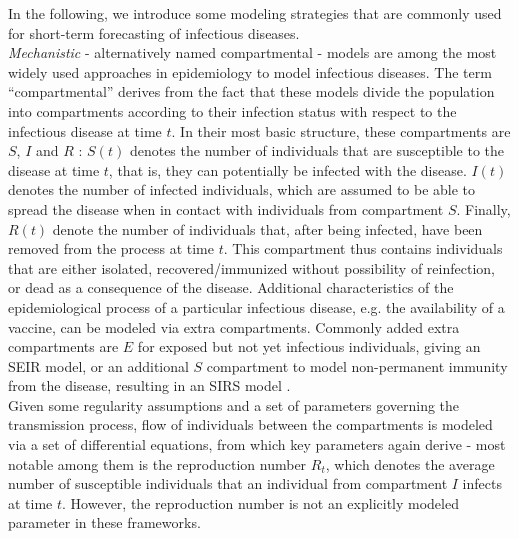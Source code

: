 In the following, we introduce some modeling strategies that are commonly used for short-term forecasting of infectious diseases.\\
\textit{Mechanistic} - alternatively named compartmental - models are among the most widely used approaches in epidemiology to model infectious diseases. The term ``compartmental'' derives from the fact that these models divide the population into compartments according to their infection status with respect to the infectious disease at time $t$. In their most basic structure, these compartments are $S$, $I$ and $R$ \citep{brauer_epidemic_2012}: $S(t)$ denotes the number of individuals that are susceptible to the disease at time $t$, that is, they can potentially be infected with the disease. $I(t)$ denotes the number of infected individuals, which are assumed to be able to spread the disease when in contact with individuals from compartment $S$. Finally, $R(t)$ denote the number of individuals that, after being infected, have been removed from the process at time $t$. This compartment thus contains individuals that are either isolated, recovered/immunized without possibility of reinfection, or dead as a consequence of the disease. Additional characteristics of the epidemiological process of a particular infectious disease, e.g. the availability of a vaccine, can be modeled via extra compartments. Commonly added extra compartments are $E$ for exposed but not yet infectious individuals, giving an SEIR model, or an additional $S$ compartment to model non-permanent immunity from the disease, resulting in an SIRS model \citep{brauer_epidemic_2012}. \\
Given some regularity assumptions and a set of parameters governing the transmission process, flow of individuals between the compartments is modeled via a set of differential equations, from which key parameters again derive - most notable among them is the reproduction number $R_t$, which denotes the average number of susceptible individuals that an individual from compartment $I$ infects at time $t$. However, the reproduction number is not an explicitly modeled parameter in these frameworks. \medskip\\
